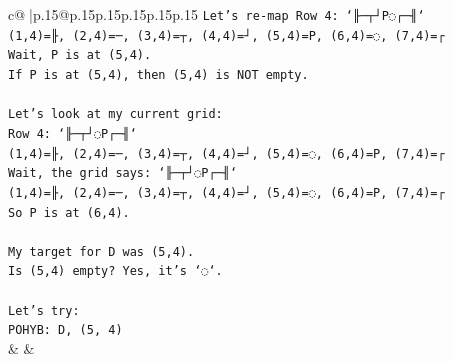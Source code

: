 \documentclass{article}
\begin{document}
{\begin{supertabular}{c@{$\;$}|p{.15\linewidth}@{}p{.15\linewidth}p{.15\linewidth}p{.15\linewidth}p{.15\linewidth}p{.15\linewidth}}
{{{\texttt{Let's re{-}map Row 4: `╟─┬┘P◌┌─╢`} \\
\texttt{(1,4)=╟, (2,4)=─, (3,4)=┬, (4,4)=┘, (5,4)=P, (6,4)=◌, (7,4)=┌} \\
\texttt{Wait, P is at (5,4).} \\
\texttt{If P is at (5,4), then (5,4) is NOT empty.} \\
\\ 
\texttt{Let's look at my current grid:} \\
\texttt{Row 4: `╟─┬┘◌P┌─╢`} \\
\texttt{(1,4)=╟, (2,4)=─, (3,4)=┬, (4,4)=┘, (5,4)=◌, (6,4)=P, (7,4)=┌} \\
\texttt{Wait, the grid says: `╟─┬┘◌P┌─╢`} \\
\texttt{(1,4)=╟, (2,4)=─, (3,4)=┬, (4,4)=┘, (5,4)=◌, (6,4)=P, (7,4)=┌} \\
\texttt{So P is at (6,4).} \\
\\ 
\texttt{My target for D was (5,4).} \\
\texttt{Is (5,4) empty? Yes, it's `◌`.} \\
\\ 
\texttt{Let's try:} \\
\texttt{POHYB: D, (5, 4)} \\
            }
        }
    }
    & & \\ \\


\end{supertabular}}
\end{document}
